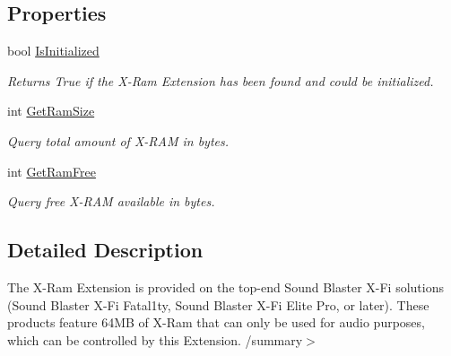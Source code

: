 \subsection*{Properties}
\begin{DoxyCompactItemize}
\item 
bool \hyperlink{class_open_t_k_1_1_audio_1_1_open_a_l_1_1_x_ram_extension_ad20a93cf7373b02fa38cfe469706113c}{Is\-Initialized}
\begin{DoxyCompactList}\small\item\em Returns True if the X-\/\-Ram Extension has been found and could be initialized.\end{DoxyCompactList}\item 
int \hyperlink{class_open_t_k_1_1_audio_1_1_open_a_l_1_1_x_ram_extension_a6e8366ca9f296a39641b08b65844b212}{Get\-Ram\-Size}
\begin{DoxyCompactList}\small\item\em Query total amount of X-\/\-R\-A\-M in bytes.\end{DoxyCompactList}\item 
int \hyperlink{class_open_t_k_1_1_audio_1_1_open_a_l_1_1_x_ram_extension_afc089bafb3c8e9e3228d5d9fcb65796e}{Get\-Ram\-Free}
\begin{DoxyCompactList}\small\item\em Query free X-\/\-R\-A\-M available in bytes.\end{DoxyCompactList}\end{DoxyCompactItemize}


\subsection{Detailed Description}
The X-\/\-Ram Extension is provided on the top-\/end Sound Blaster X-\/\-Fi solutions (Sound Blaster X-\/\-Fi Fatal1ty, Sound Blaster X-\/\-Fi Elite Pro, or later). These products feature 64\-M\-B of X-\/\-Ram that can only be used for audio purposes, which can be controlled by this Extension. /summary$>$ 

